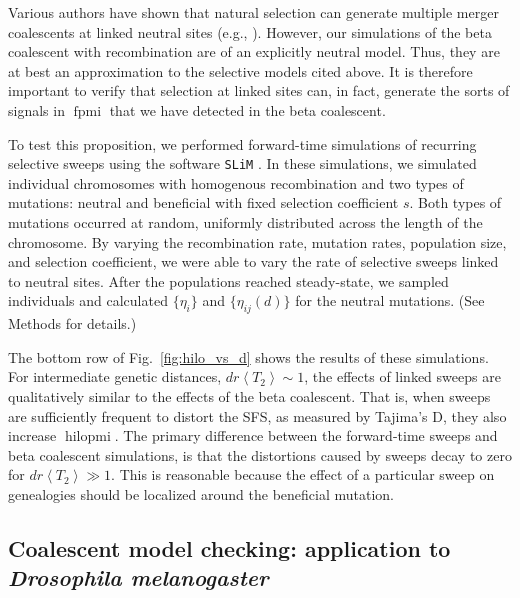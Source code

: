 \documentclass[11pt, letterpaper]{article}   	%
\newcommand{\fig}[1]{Fig.~\ref{#1}}
\newcommand{\E}[1]{\left< #1 \right>}
\DeclareMathOperator{\fpmi}{fpmi}
\DeclareMathOperator{\hilopmi}{hilopmi}
\begin{document}
Various authors have shown that natural selection can generate multiple merger coalescents at linked neutral sites (e.g., \cite{DurrettSchweinsberg2005, CoopRalph, NeherHallatscheck2013, DesaiEtAl, Seger}).
However, our simulations of the beta coalescent with recombination are of an explicitly neutral model.
Thus, they are at best an approximation to the selective models cited above.
It is therefore important to verify that selection at linked sites can, in fact, generate the sorts of signals in $\fpmi$ that we have detected in the beta coalescent.

To test this proposition, we performed forward-time simulations of recurring selective sweeps using the software \texttt{SLiM} \autocite{MesserEtAl201?}.
In these simulations, we simulated individual chromosomes with homogenous recombination and two types of mutations: neutral and beneficial with fixed selection coefficient $s$.
Both types of mutations occurred at random, uniformly distributed across the length of the chromosome.
By varying the recombination rate, mutation rates, population size, and selection coefficient, we were able to vary the rate of selective sweeps linked to neutral sites.
After the populations reached steady-state, we sampled individuals and calculated $\{\eta_i\}$ and $\{\eta_{ij}(d)\}$ for the neutral mutations.
(See Methods for details.)

The bottom row of \fig{fig:hilo_vs_d} shows the results of these simulations.
For intermediate genetic distances, $d r \E{T_2} \sim 1$, the effects of linked sweeps are qualitatively similar to the effects of the beta coalescent.
That is, when sweeps are sufficiently frequent to distort the SFS, as measured by Tajima's D, they also increase $\hilopmi$.
The primary difference between the forward-time sweeps and beta coalescent simulations, is that the distortions caused by sweeps decay to zero for $d r \E{T_2} \gg 1$.
This is reasonable because the effect of a particular sweep on genealogies should be localized around the beneficial mutation.

\subsection*{Coalescent model checking: application to \textit{Drosophila melanogaster}}
\end{document}
